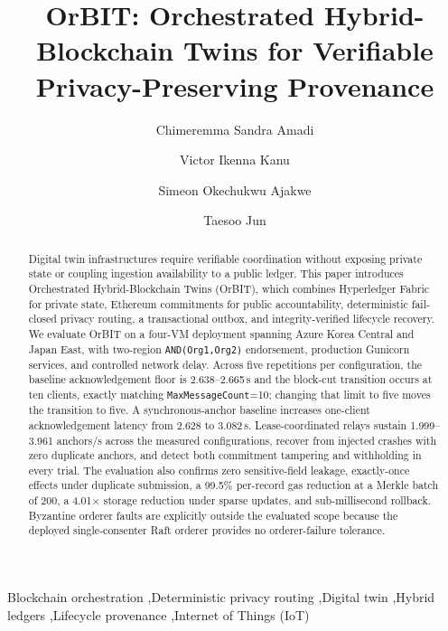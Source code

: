 \documentclass[preprint,12pt]{elsarticle}
\begin{document}
\begin{frontmatter}

\title{OrBIT: Orchestrated Hybrid-Blockchain Twins for Verifiable Privacy-Preserving Provenance}

\author[first]{Chimeremma Sandra Amadi}
\author[first]{Victor Ikenna Kanu}
\author[second]{Simeon Okechukwu Ajakwe}
\author[first]{Taesoo Jun}



\begin{abstract}
Digital twin infrastructures require verifiable coordination without exposing private state or coupling ingestion availability to a public ledger. This paper introduces Orchestrated Hybrid-Blockchain Twins (OrBIT), which combines Hyperledger Fabric for private state, Ethereum commitments for public accountability, deterministic fail-closed privacy routing, a transactional outbox, and integrity-verified lifecycle recovery. We evaluate OrBIT on a four-VM deployment spanning Azure Korea Central and Japan East, with two-region \texttt{AND(Org1,Org2)} endorsement, production Gunicorn services, and controlled network delay. Across five repetitions per configuration, the baseline acknowledgement floor is 2.638--2.665\,s and the block-cut transition occurs at ten clients, exactly matching \texttt{MaxMessageCount}=10; changing that limit to five moves the transition to five. A synchronous-anchor baseline increases one-client acknowledgement latency from 2.628 to 3.082\,s. Lease-coordinated relays sustain 1.999--3.961 anchors/s across the measured configurations, recover from injected crashes with zero duplicate anchors, and detect both commitment tampering and withholding in every trial. The evaluation also confirms zero sensitive-field leakage, exactly-once effects under duplicate submission, a 99.5\% per-record gas reduction at a Merkle batch of 200, a 4.01$\times$ storage reduction under sparse updates, and sub-millisecond rollback. Byzantine orderer faults are explicitly outside the evaluated scope because the deployed single-consenter Raft orderer provides no orderer-failure tolerance.
\end{abstract}

\begin{keyword}
Blockchain orchestration
\sep Deterministic privacy routing
\sep Digital twin
\sep Hybrid ledgers
\sep Lifecycle provenance
\sep Internet of Things (IoT)
\end{keyword}

\end{frontmatter}
\end{document}
